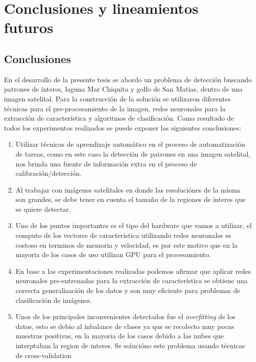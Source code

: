\chapter{Conclusiones y lineamientos futuros}\label{chap:conclusiones}


\section{Conclusiones}
En el desarrollo de la presente tesis se abordo un problema de detección buscando patrones de interes, laguna Mar Chiquita y golfo de San Matias, dentro de una imagen satelital.
Para la construcción de la solución se utilizaron diferentes técnicas para el pre-procesamiento de la imagen, redes neuronales para la extracción de característica y algoritmos de clasificación. Como resultado de todos los experimentos realizados se puede exponer las siguientes conclusiones:

\begin{enumerate}
\item Utilizar técnicas de aprendizaje automático en el proceso de automatización de tareas, como en este caso la detección de patrones en una imagen satelital, nos brinda una fuente de información extra en el proceso de calibración/detección. 

\item Al trabajar con imágenes satelitales en donde las resoluciónes de la misma son grandes, se debe tener en cuenta el tamaño de la regiones de interes que se quiere detectar.

\item Uno de los puntos importantes es el tipo del hardware que vamos a utilizar, el computo de los vectores de característica utilizando redes neuronales es costoso en terminos de memoria y velocidad, es por este motivo que en la mayoria de los casos de uso utilizan GPU para el procesamiento.

\item En base a las experimentaciones realizadas podemos afirmar que aplicar redes neuronales pre-entrenadas para la extracción de característica se obtiene una correcta generalización de los datos y son muy eficiente para problemas de clasificación de imágenes.

\item Unos de los principales inconvenientes detectados fue el \textit{overfitting} de los datos, esto se debio al inbalance de clases ya que se recolecto muy pocas muestras positivas, en la mayoria de los casos debido a las nubes que interptaban la region de interes. Se solucióno este problema usando técnicas de cross-validation

\end{enumerate}

